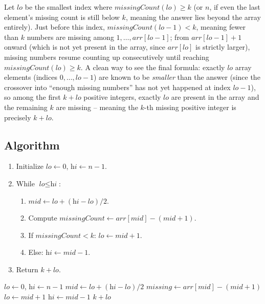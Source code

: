 Let $\textit{lo}$ be the smallest index where $\textit{missingCount}
(\textit{lo}) \ge k$ (or $n$, if even the last element's missing count is
still below $k$, meaning the answer lies beyond the array entirely). Just
before this index, $\textit{missingCount}(\textit{lo}-1) < k$, meaning
fewer than $k$ numbers are missing among $1, \dots, \textit{arr}
[\textit{lo}-1]$; from $\textit{arr}[\textit{lo}-1]+1$ onward (which is not
yet present in the array, since $\textit{arr}[\textit{lo}]$ is strictly
larger), missing numbers resume counting up consecutively until reaching
$\textit{missingCount}(\textit{lo}) \ge k$. A clean way to see the final
formula: exactly $\textit{lo}$ array elements (indices $0, \dots,
\textit{lo}-1$) are known to be \emph{smaller} than the answer (since the
crossover into ``enough missing numbers'' has not yet happened at index
$\textit{lo}-1$), so among the first $k + \textit{lo}$ positive integers,
exactly $\textit{lo}$ are present in the array and the remaining $k$ are
missing -- meaning the $k$-th missing positive integer is precisely
$k + \textit{lo}$.

\subsection*{Algorithm}

\begin{enumerate}
  \item Initialize $\textit{lo} \gets 0$, $\textit{hi} \gets n-1$.
  \item While $\textit{lo} \le \textit{hi}$:
  \begin{enumerate}
    \item $\textit{mid} \gets \textit{lo}+(\textit{hi}-\textit{lo})/2$.
    \item Compute $\textit{missingCount} \gets \textit{arr}[\textit{mid}] -
          (\textit{mid}+1)$.
    \item If $\textit{missingCount} < k$: $\textit{lo} \gets
          \textit{mid}+1$.
    \item Else: $\textit{hi} \gets \textit{mid}-1$.
  \end{enumerate}
  \item Return $k + \textit{lo}$.
\end{enumerate}

\begin{algorithm}[H]
\caption{Kth Missing Positive Number}
\begin{algorithmic}[1]
  \State $\textit{lo} \gets 0$, $\textit{hi} \gets n-1$
    \State $\textit{mid} \gets \textit{lo}+(\textit{hi}-\textit{lo})/2$
    \State $\textit{missing} \gets \textit{arr}[\textit{mid}] - (\textit{mid}+1)$
      \State $\textit{lo} \gets \textit{mid} + 1$
    \Else
      \State $\textit{hi} \gets \textit{mid} - 1$
    \EndIf
  \EndWhile
  \State \Return $k + \textit{lo}$
\EndProcedure
\end{algorithmic}
\end{algorithm}

